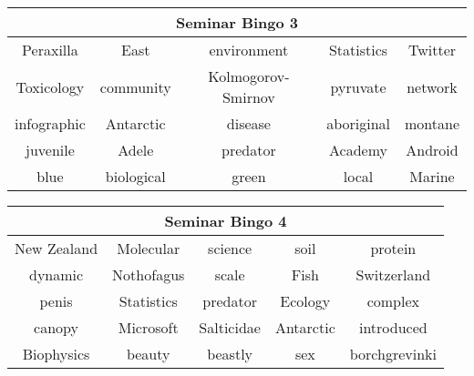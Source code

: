 \documentclass[a4paper,12pt]{article}
\begin{document}
\begin{tabular}{ |c|c|c|c|c| }
  \hline
  \multicolumn{5}{|c|}{Seminar Bingo 3} \\
  \hline
Peraxilla & East & environment & Statistics & Twitter   \\
\hline
Toxicology & community & Kolmogorov-Smirnov & pyruvate & network   \\
\hline
infographic & Antarctic & disease & aboriginal & montane   \\
\hline
juvenile & Adele & predator & Academy & Android   \\
\hline
blue & biological & green & local & Marine   \\
\hline
\end{tabular}


\clearpage
\newpage



\begin{tabular}{ |c|c|c|c|c| }
  \hline
  \multicolumn{5}{|c|}{Seminar Bingo 4} \\
  \hline
New Zealand & Molecular & science & soil & protein   \\
\hline
dynamic & Nothofagus & scale & Fish & Switzerland   \\
\hline
penis & Statistics & predator & Ecology & complex   \\
\hline
canopy & Microsoft & Salticidae & Antarctic & introduced   \\
\hline
Biophysics & beauty & beastly & sex & borchgrevinki   \\
\hline
\end{tabular}


\clearpage
\newpage
\end{document}
